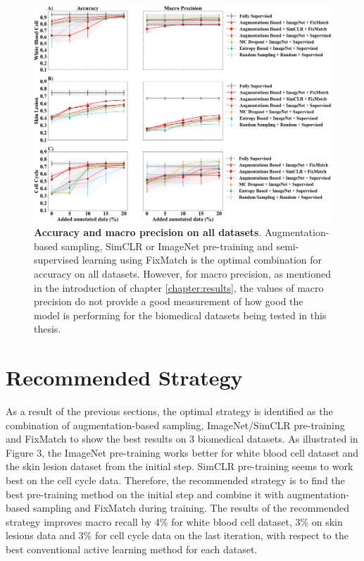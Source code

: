 \begin{figure}[htbp]
\centering
\captionsetup{format=plain}
\includegraphics[width=\textwidth]{figures/fig_3_acc_precision.png}
\caption[Accuracy and macro precision on all datasets]{\textbf{Accuracy and macro precision on all datasets}. Augmentation-based sampling, SimCLR or ImageNet pre-training and semi-supervised learning using FixMatch is the optimal combination for accuracy on all datasets. However, for macro precision, as mentioned in the introduction of chapter \ref{chapter:results}, the values of macro precision do not provide a good measurement of how good the model is performing for the biomedical datasets being tested in this thesis.}
\label{fig:all_recall_f1}
\end{figure}

\newpage

\section{Recommended Strategy}
As a result of the previous sections, the optimal strategy is identified as the combination of augmentation-based sampling, ImageNet/SimCLR pre-training and FixMatch to show the best results on 3 biomedical datasets. As illustrated in Figure 3, the ImageNet pre-training works better for white blood cell dataset and the skin lesion dataset from the initial step. SimCLR pre-training seems to work best on the cell cycle data. Therefore, the recommended strategy is to find the best pre-training method on the initial step and combine it with augmentation-based sampling and FixMatch during training. The results of the recommended strategy improves macro recall by 4\% for white blood cell dataset, 3\% on skin lesions data and 3\% for cell cycle data on the last iteration, with respect to the best conventional active learning method for each dataset.


